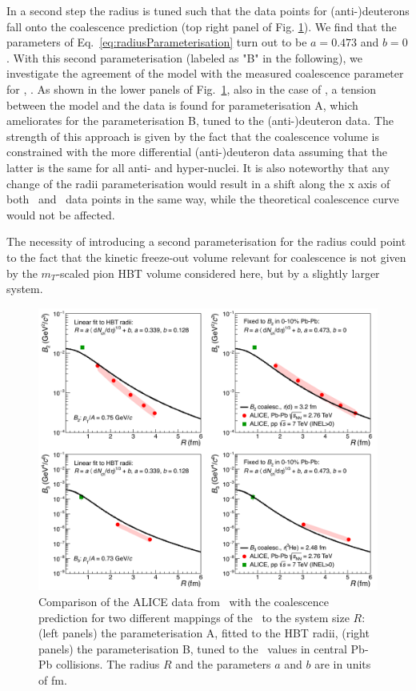 \documentclass[a4paper,11pt]{scrartcl}
\begin{document}
In a second step the radius is tuned such that the data points for (anti-)deuterons fall onto the coalescence prediction (top right panel of Fig. \ref{fig:CompareB2B3forDifferentParamWithData}). We find that the parameters of Eq.~\ref{eq:radiusParameterisation} turn out to be $a = 0.473$ and $b = 0$. 
With this second parameterisation (labeled as "B" in the following), we investigate the agreement of the model with the measured coalescence parameter for \hethree, \bthree. As shown in the lower panels of Fig.~\ref{fig:CompareB2B3forDifferentParamWithData}, also in the case of \bthree, a tension between the model and the data is found for parameterisation A, which ameliorates for the parameterisation B, tuned to the (anti-)deuteron data. The strength of this approach is given by the fact that the coalescence volume is constrained with the more differential (anti-)deuteron data assuming that the latter is the same for all anti- and hyper-nuclei. It is also noteworthy that any change of the radii parameterisation would result in a shift along the x axis of both \btwo~and \bthree~data points in the same way, while the theoretical coalescence curve would not be affected. 

The necessity of introducing a second parameterisation for the radius could point to the fact that the kinetic freeze-out volume relevant for coalescence is not given by the $m_{T}$-scaled pion HBT volume considered here, but by a slightly larger system.  

\begin{figure}[htbp]
	\begin{center}
		\includegraphics[width=\textwidth]{radiiParamCompareData.png}
		\caption{Comparison of the ALICE data from~\cite{ALICE:nucleipp2017, ALICE:deuteronppPbPb2015} with the coalescence prediction for two different mappings of the \avdNdeta~to the system size $R$: (left panels) the parameterisation A, fitted to the HBT radii, (right panels) the parameterisation B, tuned to the \btwo~values in central Pb-Pb collisions. The radius $R$ and the parameters $a$ and $b$ are in units of fm.}
		\label{fig:CompareB2B3forDifferentParamWithData}
	\end{center}
\end{figure}
\end{document}
